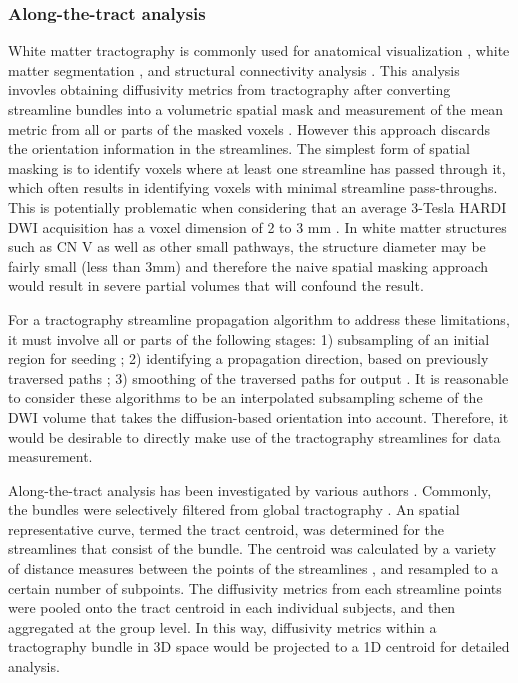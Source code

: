 \subsubsection{Along-the-tract analysis}
White matter tractography is commonly used for anatomical visualization \cite{Chen2011b}, white matter segmentation \cite{Behrens2003a,Johansen-Berg2005}, and structural connectivity analysis \cite{Cao2013,Wiech2014}. This analysis invovles obtaining diffusivity metrics from tractography after converting streamline bundles into a volumetric spatial mask and measurement of the mean metric from all or parts of the masked voxels \cite{Concha2005,Fitzsimmons2009}. However this approach discards the orientation information in the streamlines. The simplest form of spatial masking is to identify voxels where at least one streamline has passed through it, which often results in identifying voxels with minimal streamline pass-throughs. This is potentially problematic when considering that an average 3-Tesla HARDI DWI acquisition has a voxel dimension of 2 to 3 mm \cite{Neher2015,Wilkins2015}. In white matter structures such as CN V as well as other small pathways, the structure diameter may be fairly small (less than 3mm) and therefore the naive spatial masking approach would result in severe partial volumes that will confound the result. 

For a tractography streamline propagation algorithm to address these limitations, it must involve all or parts of the following stages: 1) subsampling of an initial region for seeding \cite{Basser2002,Cote2012}; 2) identifying a propagation direction, based on previously traversed paths \cite{Malcolm2010,Qazi2009,Tournier2010}; 3) smoothing of the traversed paths for output \cite{Tuch2000d}. It is reasonable to consider these algorithms to be an interpolated subsampling scheme of the DWI volume that takes the diffusion-based orientation into account. Therefore, it would be desirable to directly make use of the tractography streamlines for data measurement. 

Along-the-tract analysis has been investigated by various authors \cite{Colby2012,ODonnell2009,Wang2015,Yeatman2012}. Commonly, the bundles were selectively filtered from global tractography \cite{Wang2015,Yeatman2012}. An spatial representative curve, termed the tract centroid, was determined for the streamlines that consist of the bundle. The centroid was calculated by a variety of distance measures between the points of the streamlines \cite{Garyfallidis2012}, and resampled to a certain number of subpoints. The diffusivity metrics from each streamline points were pooled onto the tract centroid in each individual subjects, and then aggregated at the group level. In this way, diffusivity metrics within a tractography bundle in 3D space would be projected to a 1D centroid for detailed analysis. 

